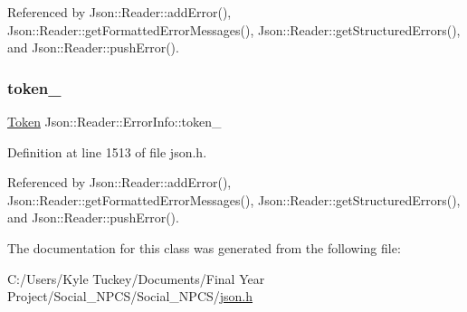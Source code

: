Referenced by Json\+::\+Reader\+::add\+Error(), Json\+::\+Reader\+::get\+Formatted\+Error\+Messages(), Json\+::\+Reader\+::get\+Structured\+Errors(), and Json\+::\+Reader\+::push\+Error().

\mbox{\label{class_json_1_1_reader_1_1_error_info_a52e1c71b12eb1c3f0395d7ef1e778ce6}} 
\subsubsection{\texorpdfstring{token\+\_\+}{token\_}}
{\footnotesize\ttfamily \hyperlink{class_json_1_1_reader_1_1_token}{Token} Json\+::\+Reader\+::\+Error\+Info\+::token\+\_\+}



Definition at line 1513 of file json.\+h.



Referenced by Json\+::\+Reader\+::add\+Error(), Json\+::\+Reader\+::get\+Formatted\+Error\+Messages(), Json\+::\+Reader\+::get\+Structured\+Errors(), and Json\+::\+Reader\+::push\+Error().



The documentation for this class was generated from the following file\+:\begin{DoxyCompactItemize}
\item 
C\+:/\+Users/\+Kyle Tuckey/\+Documents/\+Final Year Project/\+Social\+\_\+\+N\+P\+C\+S/\+Social\+\_\+\+N\+P\+C\+S/\hyperlink{json_8h}{json.\+h}\end{DoxyCompactItemize}
